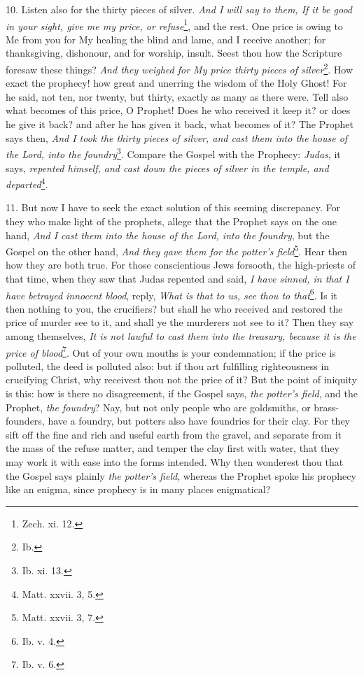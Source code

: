 10. Listen also for the thirty pieces of silver. \emph{And I will say to them, If it be good in your sight, give me my price, or refuse}\footnote{Zech. xi. 12.}, and the rest. One price is owing to Me from you for My healing the blind and lame, and I receive another; for thanksgiving, dishonour, and for worship, insult. Seest thou how the Scripture foresaw these things? \emph{And they weighed for My price thirty pieces of silver}\footnote{Ib.}. How exact the prophecy! how great and unerring the wisdom of the Holy Ghost! For he said, not ten, nor twenty, but thirty, exactly as many as there were. Tell also what becomes of this price, O Prophet! Does he who received it keep it? or does he give it back? and after he has given it back, what becomes of it? The Prophet says then, \emph{And I took the thirty pieces of silver, and cast them into the house of the Lord, into the foundry}\footnote{Ib. xi. 13.}. Compare the Gospel with the Prophecy: \emph{Judas}, it says, \emph{repented himself, and cast down the pieces of silver in the temple, and departed}\footnote{Matt. xxvii. 3, 5.}.

11. But now I have to seek the exact solution of this seeming discrepancy. For they who make light of the prophets, allege that the Prophet says on the one hand, \emph{And I cast them into the house of the Lord, into the foundry}, but the Gospel on the other hand, \emph{And they gave them for the potter’s field}\footnote{Matt. xxvii. 3, 7.}. Hear then how they are both true. For those conscientious Jews forsooth, the high-priests of that time, when they saw that Judas repented and said, \emph{I have sinned, in that I have betrayed innocent blood}, reply, \emph{What is that to us, see thou to that}\footnote{Ib. v. 4.}. Is it then nothing to you, the crucifiers? but shall he who received and restored the price of murder see to it, and shall ye the murderers not see to it? Then they say among themselves, \emph{It is not lawful to cast them into the treasury, because it is the price of blood}\footnote{Ib. v. 6.}. Out of your own mouths is your condemnation; if the price is polluted, the deed is polluted also: but if thou art fulfilling righteousness in crucifying Christ, why receivest thou not the price of it? But the point of iniquity is this: how is there no disagreement, if the Gospel says, \emph{the potter’s field}, and the Prophet, \emph{the foundry}? Nay, but not only people who are goldsmiths, or brass-founders, have a foundry, but potters also have foundries for their clay. For they sift off the fine and rich and useful earth from the gravel, and separate from it the mass of the refuse matter, and temper the clay first with water, that they may work it with ease into the forms intended. Why then wonderest thou that the Gospel says plainly \emph{the potter’s field}, whereas the Prophet spoke his prophecy like an enigma, since prophecy is in many places enigmatical?

